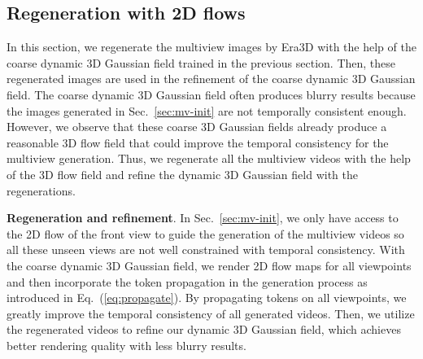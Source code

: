 \subsection{Regeneration with 2D flows}
\label{sec:mv-re}
In this section, we regenerate the multiview images by Era3D with the help of the coarse dynamic 3D Gaussian field trained in the previous section. Then, these regenerated images are used in the refinement of the coarse dynamic 3D Gaussian field. The coarse dynamic 3D Gaussian field often produces blurry results because the images generated in Sec.~\ref{sec:mv-init} are not temporally consistent enough. However, we observe that these coarse 3D Gaussian fields already produce a reasonable 3D flow field that could improve the temporal consistency for the multiview generation. Thus, we regenerate all the multiview videos with the help of the 3D flow field and refine the dynamic 3D Gaussian field with the regenerations.


\textbf{Regeneration and refinement}. In Sec.~\ref{sec:mv-init}, we only have access to the 2D flow of the front view to guide the generation of the multiview videos so all these unseen views are not well constrained with temporal consistency. With the coarse dynamic 3D Gaussian field, we render 2D flow maps for all viewpoints and then incorporate the token propagation in the generation process as introduced in Eq.~(\ref{eq:propagate}). By propagating tokens on all viewpoints, we greatly improve the temporal consistency of all generated videos. Then, we utilize the regenerated videos to refine our dynamic 3D Gaussian field, which achieves better rendering quality with less blurry results.




